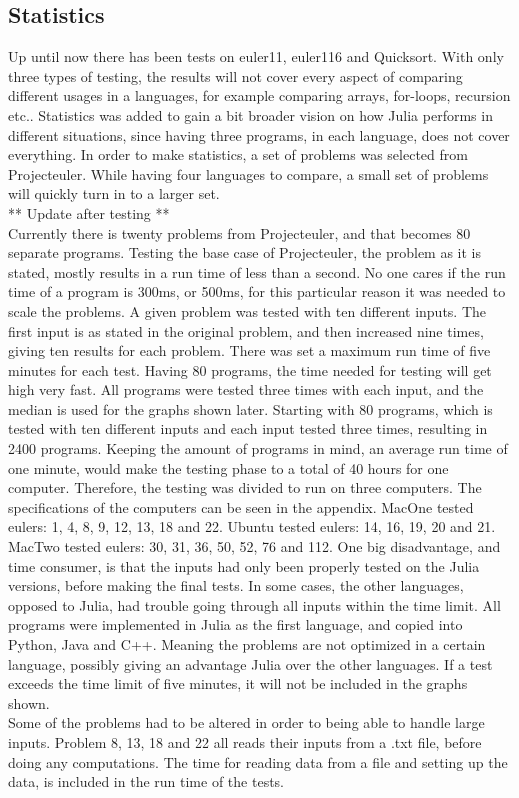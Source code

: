 \documentclass[a4paper, 11pt, titlepage]{article}
\begin{document}
\subsection{Statistics}
Up until now there has been tests on euler11, euler116 and Quicksort. With only three types of testing, the results will not cover every aspect of comparing different usages in a languages, for example comparing arrays, for-loops, recursion etc.. 
Statistics was added to gain a bit broader vision on how Julia performs in different situations, since having three programs, in each language, does not cover everything. 
In order to make statistics, a set of problems was selected from Projecteuler. While having four languages to compare, a small set of problems will quickly turn in to a larger set. \\
** Update after testing ** \\
Currently there is twenty problems from Projecteuler, and that becomes 80 separate programs. Testing the base case of Projecteuler, the problem as it is stated, mostly results in a run time of less than a second. No one cares if the run time of a program is 300ms, or 500ms, for this particular reason it was needed to scale the problems. A given problem was tested with ten different inputs. The first input is as stated in the original problem, and then increased nine times, giving ten results for each problem. There was set a maximum run time of five minutes for each test. Having 80 programs, the time needed for testing will get high very fast. All programs were tested three times with each input, and the median is used for the graphs shown later. 
Starting with 80 programs, which is tested with ten different inputs and each input tested three times, resulting in 2400 programs. Keeping the amount of programs in mind, an average run time of one minute, would make the testing phase to a total of 40 hours for one computer. 
Therefore, the testing was divided to run on three computers. The specifications of the computers can be seen in the appendix. MacOne tested eulers: 1, 4, 8, 9, 12, 13, 18 and 22. Ubuntu tested eulers: 14, 16, 19, 20 and 21. MacTwo tested eulers: 30, 31, 36, 50, 52, 76 and 112.
One big disadvantage, and time consumer, is that the inputs had only been properly tested on the Julia versions, before making the final tests. In some cases, the other languages, opposed to Julia, had trouble going through all inputs within the time limit. All programs were implemented in Julia as the first language, and copied into Python, Java and C++. Meaning the problems are not optimized in a certain language, possibly giving an advantage Julia over the other languages.
If a test exceeds the time limit of five minutes, it will not be included in the graphs shown.
\\
Some of the problems had to be altered in order to being able to handle large inputs. Problem 8, 13, 18 and 22 all reads their inputs from a .txt file, before doing any computations. The time for reading data from a file and setting up the data, is included in the run time of the tests. 
\end{document}
